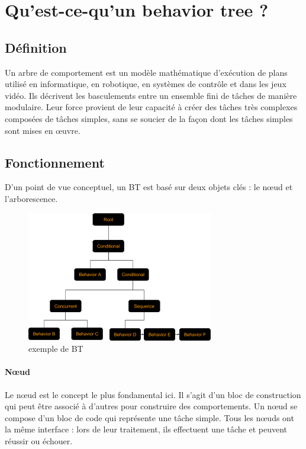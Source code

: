 \documentclass[titlepage]{article}
\begin{document}
	\section{Qu'est-ce-qu'un behavior tree ?}
		\subsection{Définition}
		Un arbre de comportement est un modèle mathématique d'exécution de plans utilisé en informatique, en robotique, en systèmes de contrôle et dans les jeux vidéo. Ils décrivent les basculements entre un ensemble fini de tâches de manière modulaire. Leur force provient de leur capacité à créer des tâches très complexes composées de tâches simples, sans se soucier de la façon dont les tâches simples sont mises en œuvre. \cite{wikipedia_BT}
		\subsection{Fonctionnement}
		
		D'un point de vue conceptuel, un BT est basé sur deux objets clés : le nœud et l'arborescence.
		
		\begin{figure}[h!]
			\includegraphics[width=\linewidth]{img/behavior_trees_example.png}
			\caption{exemple de BT \cite{rasmussen}}
			\label{fig:BT1}
		\end{figure}
		
		\paragraph{Nœud}
		Le nœud est le concept le plus fondamental ici. Il s'agit d'un bloc de construction qui peut être associé à d'autres pour construire des comportements. Un nœud se compose d'un bloc de code qui représente une tâche simple. Tous les nœuds ont la même interface : lors de leur traitement, ils effectuent une tâche et peuvent réussir ou échouer.
		
\end{document}
